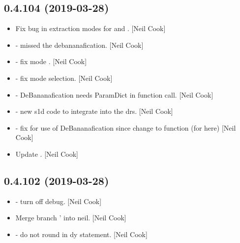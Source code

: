 \documentclass[a4paper,10pt,english]{report}
\begin{document}
\subsection{0.4.104 (2019-03-28)}
\label{\detokenize{misc/changelog:id155}}\begin{itemize}
\item {} 
Fix bug in extraction modes for  and
. {[}Neil Cook{]}

\item {} 
 - missed the debananafication. {[}Neil Cook{]}

\item {} 
 - fix mode . {[}Neil Cook{]}

\item {} 
 - fix mode selection. {[}Neil Cook{]}

\item {} 
 - DeBananafication needs ParamDict in function call.
{[}Neil Cook{]}

\item {} 
 - new s1d code to integrate into the drs.
{[}Neil Cook{]}

\item {} 
 - fix for use of DeBananafication since change to
function (for  here) {[}Neil Cook{]}

\item {} 
Update . {[}Neil Cook{]}

\end{itemize}


\subsection{0.4.102 (2019-03-28)}
\label{\detokenize{misc/changelog:id156}}\begin{itemize}
\item {} 
 - turn off  debug. {[}Neil Cook{]}

\item {} 
Merge branch ’ into neil. {[}Neil Cook{]}

\item {} 
 - do not round in dy statement. {[}Neil Cook{]}

\end{itemize}
\end{document}
